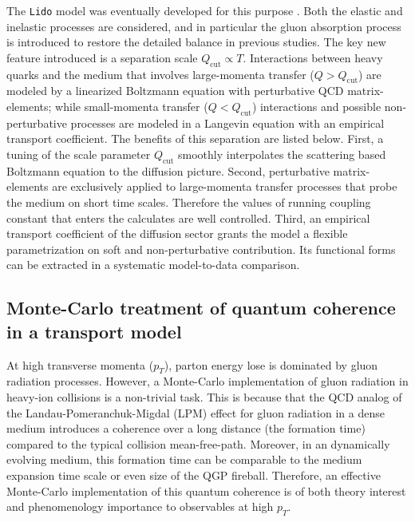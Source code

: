 \documentclass[10pt,a4paper]{article}
\begin{document}
The {\tt Lido} model was eventually developed for this purpose \cite{Ke:2018tsh, Ke:2018jem}. Both the elastic and inelastic processes are considered, and in particular the gluon absorption process is introduced to restore the detailed balance in previous studies.
The key new feature introduced is a separation scale $Q_{\textrm{cut}}\propto T$. Interactions between heavy quarks and the medium that involves large-momenta transfer ($Q > Q_{\textrm{cut}}$) are modeled by a linearized Boltzmann equation with perturbative QCD matrix-elements;  while small-momenta transfer ($Q < Q_{\textrm{cut}}$) interactions and possible non-perturbative processes are modeled in a Langevin equation with an empirical transport coefficient. The benefits of this separation are listed below. First, a tuning of the scale parameter $Q_{\textrm{cut}}$ smoothly interpolates the scattering based Boltzmann equation to the diffusion picture. Second, perturbative matrix-elements are exclusively applied to large-momenta transfer processes that probe the medium on short time scales. Therefore the values of running coupling constant that enters the calculates are well controlled. Third, an empirical transport coefficient of the diffusion sector grants the model a flexible parametrization on soft and non-perturbative contribution. Its functional forms can be extracted in a systematic model-to-data comparison.

\subsection{Monte-Carlo treatment of quantum coherence in a transport model}
At high transverse momenta ($p_T$), parton energy lose is dominated by gluon radiation processes. However, a Monte-Carlo implementation of gluon radiation in heavy-ion collisions is a non-trivial task. This is because that the QCD analog of the Landau-Pomeranchuk-Migdal (LPM) effect for gluon radiation in a dense medium introduces a coherence over a long distance (the formation time) compared to the typical collision mean-free-path. Moreover, in an dynamically evolving medium, this formation time can be comparable to the medium expansion time scale or even size of the QGP fireball. Therefore, an effective Monte-Carlo implementation of this quantum coherence is of both theory interest and phenomenology importance to observables at high $p_T$.
\end{document}
